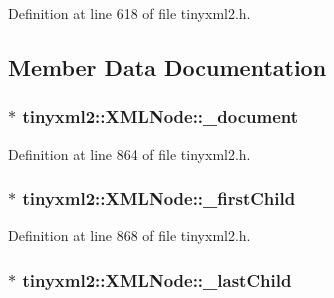 Definition at line 618 of file tinyxml2.\+h.



\subsection{Member Data Documentation}
\hypertarget{classtinyxml2_1_1_x_m_l_node_a8d2d2be0bb6797625551eb0e91f0ff62}{
\subsubsection[{\+\_\+document}]{$\ast$ tinyxml2\+::\+X\+M\+L\+Node\+::\+\_\+document\hspace{0.3cm}{\ttfamily [protected]}}}\label{classtinyxml2_1_1_x_m_l_node_a8d2d2be0bb6797625551eb0e91f0ff62}


Definition at line 864 of file tinyxml2.\+h.

\hypertarget{classtinyxml2_1_1_x_m_l_node_aa20c91e4213dc930c5bdf420322ca342}{
\subsubsection[{\+\_\+first\+Child}]{$\ast$ tinyxml2\+::\+X\+M\+L\+Node\+::\+\_\+first\+Child\hspace{0.3cm}{\ttfamily [protected]}}}\label{classtinyxml2_1_1_x_m_l_node_aa20c91e4213dc930c5bdf420322ca342}


Definition at line 868 of file tinyxml2.\+h.

\hypertarget{classtinyxml2_1_1_x_m_l_node_a099b6560ae44ab9edb8453aaf1a3747b}{
\subsubsection[{\+\_\+last\+Child}]{$\ast$ tinyxml2\+::\+X\+M\+L\+Node\+::\+\_\+last\+Child\hspace{0.3cm}{\ttfamily [protected]}}}\label{classtinyxml2_1_1_x_m_l_node_a099b6560ae44ab9edb8453aaf1a3747b}



